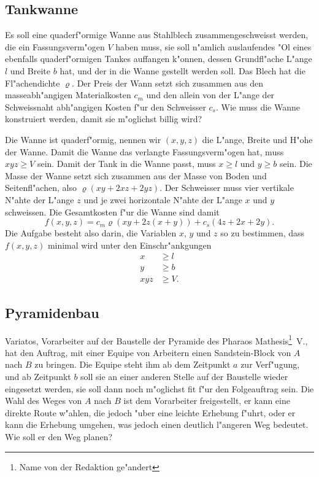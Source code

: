 \subsection{Tankwanne\label{uebersicht:wanne}}
Es soll eine quaderf"ormige Wanne aus Stahlblech zusammengeschweisst
werden, die ein Fassungsverm"ogen $V$ haben muss, sie soll n"amlich
auslaufendes "Ol eines ebenfalls quaderf"ormigen Tankes auffangen k"onnen,
dessen Grundfl"ache L"ange $l$ und Breite $b$ hat, und der in die
Wanne gestellt werden soll.
Das Blech hat die Fl"achendichte $\varrho$. Der Preis der Wann setzt sich
zusammen aus den masseabh"angigen Materialkosten $c_m$ und den allein
von der L"ange der Schweissnaht abh"angigen Kosten f"ur den Schweisser
$c_s$. Wie muss die Wanne konstruiert werden, damit sie m"oglichst 
billig wird?

Die Wanne ist quaderf"ormig, nennen wir $(x,y,z)$ die L"ange, Breite
und H"ohe der Wanne. Damit die Wanne das verlangte
Fassungsverm"ogen hat, muss $xyz\ge V$ sein.
Damit der Tank in die Wanne passt, muss $x\ge l$ und $y\ge b$ sein.
Die Masse der Wanne setzt sich zusammen aus der Masse von Boden
und Seitenfl"achen, also
$\varrho(xy+2xz+2yz)$. Der Schweisser muss vier vertikale N"ahte
der L"ange $z$ und je zwei horizontale N"ahte der L"ange $x$ und $y$
schweissen. Die Gesamtkosten f"ur die Wanne sind damit
\[
f(x,y,z)=c_m\varrho(xy+2z(x+y))+c_s(4z+2x+2y).
\]
Die Aufgabe besteht also darin, die Variablen $x$, $y$ und $z$ so
zu bestimmen, dass $f(x,y,z)$ minimal wird unter den Einschr"ankgungen
\begin{align*}
x&\ge l\\
y&\ge b\\
xyz&\ge V.
\end{align*}

\subsection{Pyramidenbau\label{uebersicht:pyramidenbau}}
Variatos, Vorarbeiter auf der Baustelle der Pyramide des Pharaos
Mathesis\footnote{Name von der Redaktion ge"andert}~V.,
hat den Auftrag, mit
einer Equipe von Arbeitern einen Sandstein-Block von $A$ nach $B$
zu bringen. Die Equipe steht ihm ab dem Zeitpunkt $a$ zur Verf"ugung,
und ab Zeitpunkt $b$ soll sie an einer anderen Stelle auf der Baustelle
wieder eingesetzt werden, sie soll dann noch m"oglichst fit f"ur
den Folgeauftrag sein. Die Wahl des Weges von $A$ nach $B$ ist
dem Vorarbeiter freigestellt, er kann eine direkte Route w"ahlen, die
jedoch "uber eine leichte Erhebung f"uhrt, oder er kann die Erhebung
umgehen, was jedoch einen deutlich l"angeren Weg bedeutet. Wie soll
er den Weg planen?

